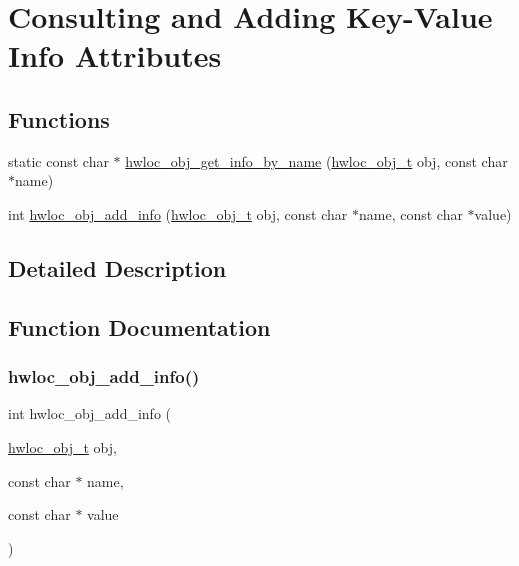 \hypertarget{a00189}{}\section{Consulting and Adding Key-\/\+Value Info Attributes}
\label{a00189}
\subsection*{Functions}
\begin{DoxyCompactItemize}
\item 
static const char $\ast$ \hyperlink{a00189_gab358661a92bb27d8542b255cc9f6f25e}{hwloc\+\_\+obj\+\_\+get\+\_\+info\+\_\+by\+\_\+name} (\hyperlink{a00185_ga79b8ab56877ef99ac59b833203391c7d}{hwloc\+\_\+obj\+\_\+t} obj, const char $\ast$name)
\item 
int \hyperlink{a00189_gace7654bb8a9002caae1a4b8a59e7452e}{hwloc\+\_\+obj\+\_\+add\+\_\+info} (\hyperlink{a00185_ga79b8ab56877ef99ac59b833203391c7d}{hwloc\+\_\+obj\+\_\+t} obj, const char $\ast$name, const char $\ast$value)
\end{DoxyCompactItemize}


\subsection{Detailed Description}


\subsection{Function Documentation}
\mbox{\label{a00189_gace7654bb8a9002caae1a4b8a59e7452e}} 
\subsubsection{\texorpdfstring{hwloc\+\_\+obj\+\_\+add\+\_\+info()}{hwloc\_obj\_add\_info()}}
{\footnotesize\ttfamily int hwloc\+\_\+obj\+\_\+add\+\_\+info (\begin{DoxyParamCaption}\item[{\hyperlink{a00185_ga79b8ab56877ef99ac59b833203391c7d}{hwloc\+\_\+obj\+\_\+t}}]{obj,  }\item[{const char $\ast$}]{name,  }\item[{const char $\ast$}]{value }\end{DoxyParamCaption})}



